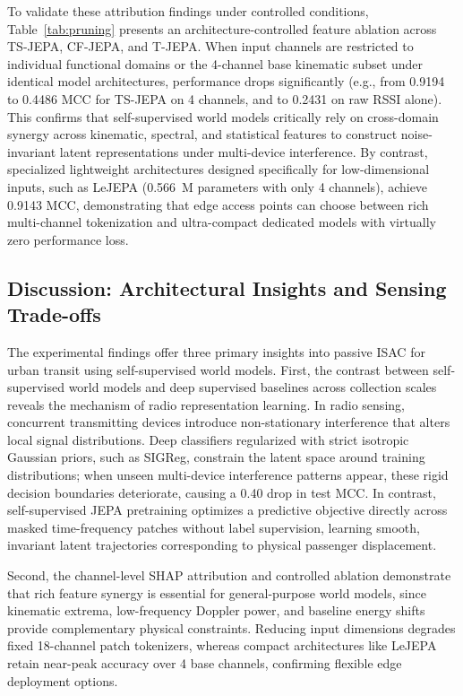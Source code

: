 To validate these attribution findings under controlled conditions, Table~\ref{tab:pruning} presents an architecture-controlled feature ablation across \ac{TS-JEPA}, CF-JEPA, and T-JEPA. When input channels are restricted to individual functional domains or the 4-channel base kinematic subset under identical model architectures, performance drops significantly (e.g., from 0.9194 to 0.4486 \ac{MCC} for \ac{TS-JEPA} on 4 channels, and to 0.2431 on raw \ac{RSSI} alone). This confirms that self-supervised world models critically rely on cross-domain synergy across kinematic, spectral, and statistical features to construct noise-invariant latent representations under multi-device interference. By contrast, specialized lightweight architectures designed specifically for low-dimensional inputs, such as LeJEPA (0.566~M parameters with only 4 channels), achieve 0.9143 \ac{MCC}, demonstrating that edge access points can choose between rich multi-channel tokenization and ultra-compact dedicated models with virtually zero performance loss.

\subsection{Discussion: Architectural Insights and Sensing Trade-offs}

The experimental findings offer three primary insights into passive ISAC for urban transit using self-supervised world models.
First, the contrast between self-supervised world models and deep supervised baselines across collection scales reveals the mechanism of radio representation learning. In radio sensing, concurrent transmitting devices introduce non-stationary interference that alters local signal distributions. Deep classifiers regularized with strict isotropic Gaussian priors, such as \ac{SIGReg}, constrain the latent space around training distributions; when unseen multi-device interference patterns appear, these rigid decision boundaries deteriorate, causing a 0.40 drop in test \ac{MCC}. In contrast, self-supervised \ac{JEPA} pretraining optimizes a predictive objective directly across masked time-frequency patches without label supervision, learning smooth, invariant latent trajectories corresponding to physical passenger displacement.

Second, the channel-level \ac{SHAP} attribution and controlled ablation demonstrate that rich feature synergy is essential for general-purpose world models, since kinematic extrema, low-frequency Doppler power, and baseline energy shifts provide complementary physical constraints. Reducing input dimensions degrades fixed 18-channel patch tokenizers, whereas compact architectures like LeJEPA retain near-peak accuracy over 4 base channels, confirming flexible edge deployment options.

